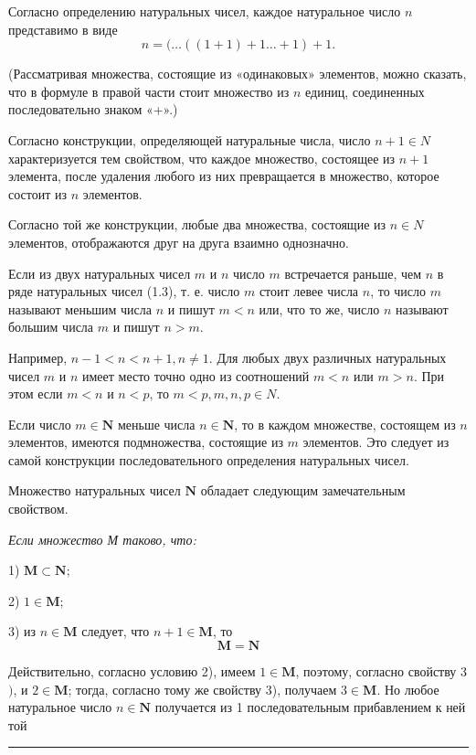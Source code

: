 \documentclass[11pt]{extbook}
\begin{document}
\setlength{\abovedisplayskip}{3pt}
\setlength{\belowdisplayskip}{3pt}
\setlength{\abovedisplayshortskip}{3pt}
\setlength{\belowdisplayshortskip}{3pt}

Согласно определению натуральных чисел, каждое натуральное число $n$ представимо в виде
\begin{equation}
  n=(\ldots((1+1)+1 \ldots+1)+1 . \tag{1.4}
\end{equation}

\noindent (Рассматривая множества, состоящие из «одинаковых» элементов, можно сказать, что в формуле в правой части стоит множество из $n$ единиц, соединенных последовательно знаком «+».)

Согласно конструкции, определяющей натуральные числа, число $n+1 \in N$ характеризуется тем свойством, что каждое множество, состоящее из $n+1$ элемента, после удаления любого из них превращается в множество, которое состоит из $n$ элементов.

Согласно той же конструкции, любые два множества, состоящие из $n \in N$ элементов, отображаются друг на друга взаимно однозначно.

Если из двух натуральных чисел $m$ и $n$ число $m$ встречается раньше, чем $n$ в ряде натуральных чисел (1.3), т. е. число $m$ стоит левее числа $n$, то число $m$ называют меньшим числа $n$ и пишут $m<n$ или, что то же, число $n$ называют большим числа $m$ и пишут $n>m$.

Например, $n-1<n<n+1, n \neq 1$. Для любых двух различных натуральных чисел $m$ и $n$ имеет место точно одно из соотношений $m<n$ или $m>n$. При этом если $m<n$ и $n<p$, то $m<p, m, n, p \in N$.

Если число $m \in \boldsymbol{N}$ меньше числа $n \in \boldsymbol{N}$, то в каждом множестве, состоящем из $n$ элементов, имеются подмножества, состоящие из $m$ элементов. Это следует из самой конструкции последовательного определения натуральных чисел.

Множество натуральных чисел $\boldsymbol{N}$ обладает следующим замечательным свойством.

\textit{Если множество М таково, что:}

1) $\boldsymbol{M} \subset \boldsymbol{N;}$

2) $1 \in \boldsymbol{M;}$

3) из $n \in \boldsymbol{M}$ следует, что $n+1 \in \boldsymbol{M}$, то
\begin{equation}
  \boldsymbol{M}=\boldsymbol{N} \tag{1.4}
\end{equation}

Действительно, согласно условию 2), имеем $1 \in \boldsymbol{M}$, поэтому, согласно свойству 3$)$, и $2 \in \boldsymbol{M}$; тогда, согласно тому же свойству 3), получаем $3 \in \boldsymbol{M}$. Но любое натуральное число $n \in \boldsymbol{N}$ получается из 1 последовательным прибавлением к ней той
\begin{center}
\rule{0.75in}{0.4pt} \\ \textit{\thepage}
\end{center}
\end{document}
